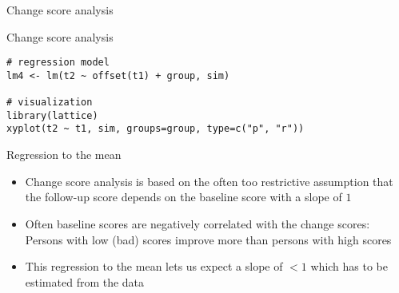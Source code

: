 \documentclass{beamer}
\begin{document}
\begin{frame}{Change score analysis}
\begin{center}
\end{center}
\end{frame}

{

\begin{frame}[fragile]{Change score analysis}
\begin{lstlisting}
# regression model
lm4 <- lm(t2 ~ offset(t1) + group, sim)

# visualization
library(lattice)
xyplot(t2 ~ t1, sim, groups=group, type=c("p", "r"))
\end{lstlisting}
\end{frame}

}

\begin{frame}{Regression to the mean}
\begin{itemize}
  \item Change score analysis is based on the often too restrictive
    assumption that the follow-up score depends on the baseline score with
    a slope of $1$
  \item Often baseline scores are negatively correlated with the change
    scores:\\
    Persons with low (bad) scores improve more than persons with high scores
  \item This regression to the mean lets us expect a slope of $< 1$ which
    has to be estimated from the data
\end{itemize}
\end{frame}
\end{document}

